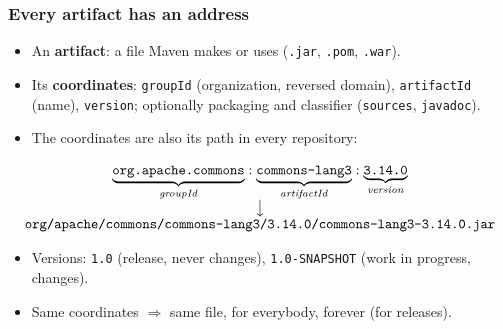 \documentclass[aspectratio=169,10pt,compress]{beamer}
\begin{document}
\begin{frame}[t,fragile] \frametitle{Every artifact has an address}
  \begin{itemize}\small
    \item An \textbf{artifact}: a file Maven makes or uses (\texttt{.jar}, \texttt{.pom}, \texttt{.war}).
    \item Its \textbf{coordinates}: \texttt{groupId} (organization, reversed domain), \texttt{artifactId} (name), \texttt{version}; optionally packaging and classifier (\texttt{sources}, \texttt{javadoc}).
    \item The coordinates are also its path in every repository:
  \end{itemize}
  \[
  	\begin{array}{c}
  		\underbrace{\texttt{org.apache.commons}}_{\mathit{groupId}} : \underbrace{\texttt{commons-lang3}}_{\mathit{artifactId}} : \underbrace{\texttt{3.14.0}}_{\mathit{version}} \\
  		\big\downarrow \\
  		\texttt{org/apache/commons/commons-lang3/3.14.0/commons-lang3-3.14.0.jar}
  	\end{array}
  \]
  \begin{itemize}\small
    \item Versions: \texttt{1.0} (release, never changes), \texttt{1.0-SNAPSHOT} (work in progress, changes).
    \item Same coordinates $\Rightarrow$ same file, for everybody, forever (for releases).
  \end{itemize}
\end{frame}

\end{document}
